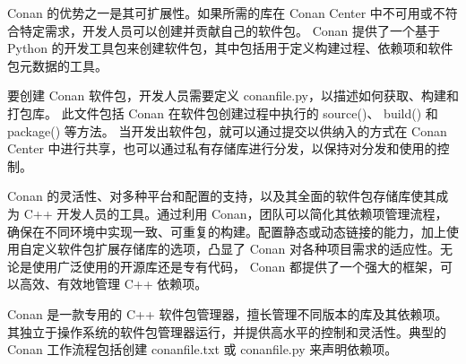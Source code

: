 
Conan 的优势之一是其可扩展性。如果所需的库在 Conan Center 中不可用或不符合特定需求，开发人员可以创建并贡献自己的软件包。 Conan 提供了一个基于 Python 的开发工具包来创建软件包，其中包括用于定义构建过程、依赖项和软件包元数据的工具。

要创建 Conan 软件包，开发人员需要定义 conanfile.py，以描述如何获取、构建和打包库。
此文件包括 Conan 在软件包创建过程中执行的 source()、 build() 和 package() 等方法。
当开发出软件包，就可以通过提交以供纳入的方式在 Conan Center 中进行共享，也可以通过私有存储库进行分发，以保持对分发和使用的控制。

Conan 的灵活性、对多种平台和配置的支持，以及其全面的软件包存储库使其成为 C++ 开发人员的工具。通过利用 Conan，团队可以简化其依赖项管理流程，确保在不同环境中实现一致、可重复的构建。配置静态或动态链接的能力，加上使用自定义软件包扩展存储库的选项，凸显了 Conan 对各种项目需求的适应性。无论是使用广泛使用的开源库还是专有代码， Conan 都提供了一个强大的框架，可以高效、有效地管理 C++ 依赖项。

Conan 是一款专用的 C++ 软件包管理器，擅长管理不同版本的库及其依赖项。其独立于操作系统的软件包管理器运行，并提供高水平的控制和灵活性。典型的 Conan 工作流程包括创建 conanfile.txt 或 conanfile.py 来声明依赖项。



















